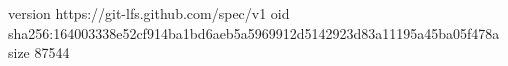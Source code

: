 version https://git-lfs.github.com/spec/v1
oid sha256:164003338e52cf914ba1bd6aeb5a5969912d5142923d83a11195a45ba05f478a
size 87544
